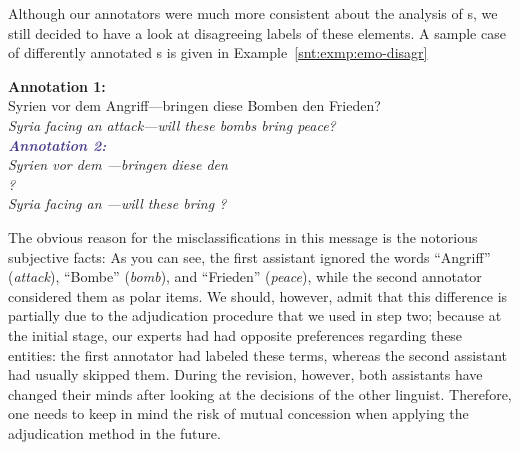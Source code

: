 Although our annotators were much more consistent about the analysis
of s, we still decided to have a look at
disagreeing labels of these elements.  A sample case of differently
annotated s is given in
Example~\ref{snt:exmp:emo-disagr}
\begin{example}\label{snt:exmp:emo-disagr}
  \textcolor{red3}{\textbf{Annotation 1:}}\\ \upshape{}Syrien vor dem
  Angriff---bringen diese Bomben den Frieden?\\[0.3em]\itshape
  \noindent\itshape{}Syria facing an attack---will these bombs bring
  peace?\\

  \noindent\textcolor{darkslateblue}{\textbf{\itshape Annotation
      2:}}\\ \upshape{}Syrien vor dem
  \emoexpression{\textcolor{red}{Angriff}}---bringen diese
  \emoexpression{\textcolor{red}{Bomben}} den\\
  \emoexpression{\textcolor{red}{Frieden}}?\\[0.3em]
  \noindent\itshape{}Syria facing an
  \upshape{}\itshape{}---will
  these
  \upshape{}\itshape{}
  bring
  \upshape{}\itshape{}?
\end{example}
The obvious reason for the misclassifications in this message is the
notorious subjective facts: As you can see, the first assistant
ignored the words ``Angriff'' (\emph{attack}), ``Bombe''
(\emph{bomb}), and ``Frieden'' (\emph{peace}), while the second
annotator considered them as polar items.
We should, however, admit that this difference is partially due to the
adjudication procedure that we used in step two; because at the
initial stage, our experts had had opposite preferences regarding
these entities: the first annotator had labeled these terms, whereas
the second assistant had usually skipped them.  During the revision,
however, both assistants have changed their minds after looking at the
decisions of the other linguist.  Therefore, one needs to keep in mind
the risk of mutual concession when applying the adjudication method in
the future.

